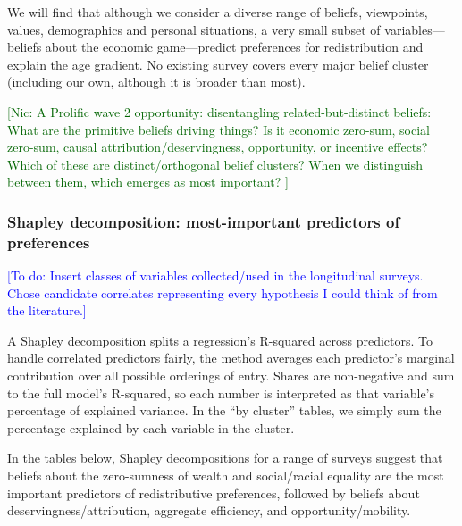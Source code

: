 \documentclass[11pt, headsepline]{article}
\newcommand{\nic}[1]{\noindent\textcolor{darkgreen}{[Nic: #1]}}
\newcommand{\todo}[1]{\noindent\textcolor{blue}{[To do: #1]}}
\begin{document}

We will find that although we consider a diverse range of beliefs, viewpoints, values, demographics and personal situations, a very small subset of variables---beliefs about the economic game---predict preferences for redistribution and explain the age gradient. No existing survey covers every major belief cluster (including our own, although it is broader than most).

\nic{A Prolific wave 2 opportunity: disentangling related-but-distinct beliefs: What are the primitive beliefs driving things? Is it economic zero-sum, social zero-sum, causal attribution/deservingness, opportunity, or incentive effects? Which of these are distinct/orthogonal belief clusters? When we distinguish between them, which emerges as most important? }


\subsubsection{Shapley decomposition: most-important predictors of preferences}


\todo{Insert classes of variables collected/used in the longitudinal surveys. Chose candidate correlates representing every hypothesis I could think of from the literature.}

A Shapley decomposition splits a regression's R-squared across predictors. To handle correlated predictors fairly, the method averages each predictor's marginal contribution over all possible orderings of entry. Shares are non-negative and sum to the full model's R-squared, so each number is interpreted as that variable's percentage of explained variance. In the ``by cluster'' tables, we simply sum the percentage explained by each variable in the cluster.

In the tables below, Shapley decompositions for a range of surveys suggest that beliefs about the zero-sumness of wealth and social/racial equality are the most important predictors of redistributive preferences, followed by beliefs about deservingness/attribution, aggregate efficiency, and opportunity/mobility. 
\end{document}
